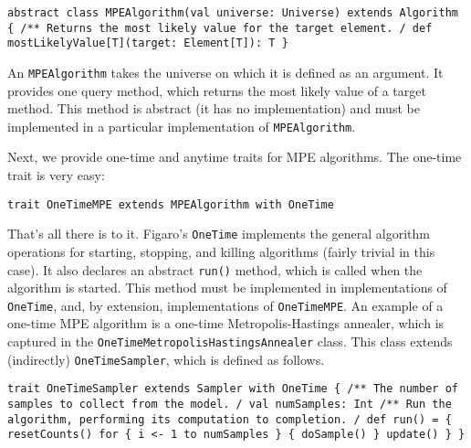 \begin{flushleft}
\texttt{abstract class MPEAlgorithm(val universe: Universe)
\newline extends Algorithm \{
\newline \tab /** 
\newline \tab * Returns the most likely value for the target element.
\newline \tab */
\newline \tab def mostLikelyValue[T](target: Element[T]): T
\newline \}
}
\end{flushleft}

An \texttt{MPEAlgorithm} takes the universe on which it is defined as an argument. It provides one query method, which returns the most likely value of a target method. This method is abstract (it has no implementation) and must be implemented in a particular implementation of  \texttt{MPEAlgorithm}.

Next, we provide one-time and anytime traits for MPE algorithms. The one-time trait is very easy:

\begin{flushleft}
\texttt{trait OneTimeMPE extends MPEAlgorithm with OneTime}
\end{flushleft}

That's all there is to it. Figaro's \texttt{OneTime} implements the general algorithm operations for starting, stopping, and killing algorithms (fairly trivial in this case). It also declares an abstract \texttt{run()} method, which is called when the algorithm is started. This method must be implemented in implementations of \texttt{OneTime}, and, by extension, implementations of \texttt{OneTimeMPE}. An example of a one-time MPE algorithm is a one-time Metropolis-Hastings annealer, which is captured in the \texttt{OneTimeMetropolisHastingsAnnealer} class. This class extends (indirectly) \texttt{OneTimeSampler}, which is defined as follows.

\begin{flushleft}
\texttt{trait OneTimeSampler extends Sampler with OneTime \{
\newline \tab /**
\newline \tab * The number of samples to collect from the model.
\newline \tab */
\newline \tab val numSamples: Int
\newline 
\newline \tab /**
\newline \tab * Run the algorithm, performing its computation to completion.
\newline \tab */
\newline \tab def run() = \{
\newline \tab resetCounts()
\newline \tab for \{ i <- 1 to numSamples \} \{ doSample() \}
\newline \tab update()
\newline \}
\newline \}
}
\end{flushleft}


